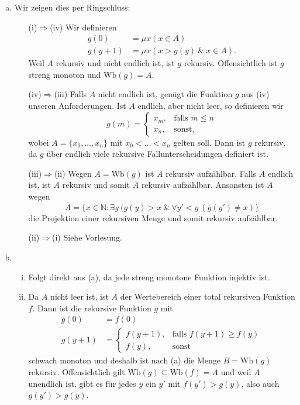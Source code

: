 \documentclass[german,headsepline]{scrartcl}
\theoremstyle{definition}
\begin{document}
	\begin{solution}
		\begin{enumerate}[(a)]
			\item Wir zeigen dies per Ringschluss:
				\begin{enumerate}[\hspace{45pt}]
					\item[(i)$\Rightarrow$(iv)] Wir definieren
						\begin{align*}
							g(0) &= \mu x(x\in A) \\
							g(y+1) &= \mu x(x>g(y)~\&~x\in A).
						\end{align*}
						Weil $A$ rekursiv und nicht endlich ist, ist $g$ rekursiv.
						Offensichtlich ist $g$ streng monoton und $\text{Wb}(g)=A$.
					\item[(iv)$\Rightarrow$(iii)] Falls $A$ nicht endlich ist, genügt die Funktion $g$ aus (iv) unseren Anforderungen.
						Ist $A$ endlich, aber nicht leer, so definieren wir
						\[g(m)=\begin{cases}
							x_m, &\text{falls }m\leq n \\
							x_n, &\text{sonst,}
						\end{cases}\]
						wobei $A=\{x_0,\dots,x_n\}$ mit $x_0<\ldots<x_n$ gelten soll.
						Dann ist $g$ rekursiv, da $g$ über endlich viele rekursive Fallunterscheidungen definiert ist.
					\item[(iii)$\Rightarrow$(ii)] Wegen $A=\text{Wb}(g)$ ist $A$ rekursiv aufzählbar.
						Falls $A$ endlich ist, ist $A$ rekursiv und somit $\overline{A}$ rekursiv aufzählbar. Ansonsten ist $\overline{A}$ wegen
						\[\overline{A}=\{x\in\mathbb{N}\colon\exists y~(g(y)>x~\&~\forall y'<y~(g(y')\neq x)\}\]
						die Projektion einer rekursiven Menge und somit rekursiv aufzählbar.
					\item[(ii)$\Rightarrow$(i)] Siehe Vorlesung.
				\end{enumerate}
			\item \begin{enumerate}[(i)]
					\item Folgt direkt aus (a), da jede streng monotone Funktion injektiv ist.
					\item Da $A$ nicht leer ist, ist $A$ der Wertebereich einer total rekursiven Funktion $f$.
						Dann ist die rekursive Funktion $g$ mit
						\begin{align*}
							g(0) &= f(0) \\
							g(y+1) &= \begin{cases}
								f(y+1), &\text{falls }f(y+1)\geq f(y) \\
								f(y), &\text{sonst}
							\end{cases}
						\end{align*}
						schwach monoton und deshalb ist nach (a) die Menge $B=\text{Wb}(g)$ rekursiv.
						Offensichtlich gilt $\text{Wb}(g)\subseteq \text{Wb}(f)=A$ und weil $A$ unendlich ist,
						gibt es für jedes $y$ ein $y'$ mit $f(y')>g(y)$, also auch $g(y')>g(y)$.
				\end{enumerate}
		\end{enumerate}
	\end{solution}
	
\end{document}
